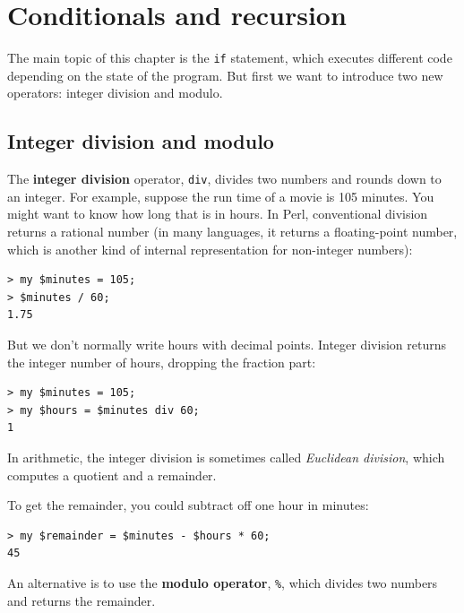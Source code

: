 \chapter{Conditionals and recursion}
\label{conditionals}

The main topic of this chapter is the {\tt if} statement, which
executes different code depending on the state of the program.
But first we want to introduce two new operators: integer 
division and modulo.


\section{Integer division and modulo}

The {\bf integer division} operator, \verb"div", divides
two numbers and rounds down to an integer.  For example, 
suppose the
run time of a movie is 105 minutes.  You might want to know how
long that is in hours.  In Perl, conventional division
returns a rational number (in many languages, it returns a 
floating-point number, which is another kind of internal 
representation for non-integer numbers):

\begin{verbatim}
> my $minutes = 105;
> $minutes / 60;
1.75
\end{verbatim}

But we don't normally write hours with decimal points.  Integer 
division returns the integer number of hours, dropping the
fraction part:

\begin{verbatim}
> my $minutes = 105;
> my $hours = $minutes div 60;
1
\end{verbatim}

In arithmetic, the integer division is sometimes called 
\emph{Euclidean division}, which computes a quotient and a 
remainder.

To get the remainder, you could subtract off one hour in minutes:

\begin{verbatim}
> my $remainder = $minutes - $hours * 60;
45
\end{verbatim}



An alternative is to use the {\bf modulo operator}, \verb"%", which
divides two numbers and returns the remainder.

